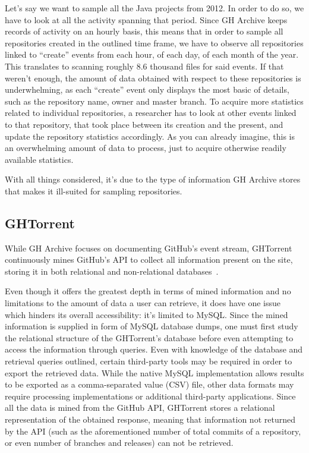 Let's say we want to sample all the Java projects from 2012.
In order to do so, we have to look at all the activity spanning that period.
Since GH Archive keeps records of activity on an hourly basis, this means that in order to sample all repositories created in the outlined time frame, we have to observe all repositories linked to ``create'' events from each hour, of each day, of each month of the year.
This translates to scanning roughly 8.6 thousand files for said events.
If that weren't enough, the amount of data obtained with respect to these repositories is underwhelming, as each ``create'' event only displays the most basic of details, such as the repository name, owner and master branch.
To acquire more statistics related to individual repositories, a researcher has to look at other events linked to that repository, that took place between its creation and the present, and update the repository statistics accordingly.
As you can already imagine, this is an overwhelming amount of data to process, just to acquire otherwise readily available statistics.

With all things considered, it's due to the type of information GH Archive stores that makes it ill-suited for sampling repositories.

\subsection{GHTorrent}

While GH Archive focuses on documenting GitHub's event stream, GHTorrent continuously mines GitHub's API to collect all information present on the site, storing it in both relational and non-relational databases~\cite{G13}.

Even though it offers the greatest depth in terms of mined information and no limitations to the amount of data a user can retrieve, it does have one issue which hinders its overall accessibility: it's limited to MySQL\@.
Since the mined information is supplied in form of MySQL database dumps, one must first study the relational structure of the GHTorrent's database before even attempting to access the information through queries.
Even with knowledge of the database and retrieval queries outlined, certain third-party tools may be required in order to export the retrieved data.
While the native MySQL implementation allows results to be exported as a comma-separated value (CSV) file, other data formats may require processing implementations or additional third-party applications.
Since all the data is mined from the GitHub API, GHTorrent stores a relational representation of the obtained response, meaning that information not returned by the API (such as the aforementioned number of total commits of a repository, or even number of branches and releases) can not be retrieved.
